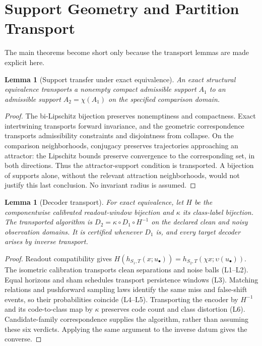 \documentclass[11pt,a4paper]{article}
\newtheorem{lemma}[theorem]{Lemma}
\theoremstyle{definition}
\begin{document}
\section{Support Geometry and Partition Transport}
The main theorems become short only because the transport lemmas are made explicit here.

\begin{lemma}[Support transfer under exact equivalence]\label{lem:support-transfer}
An exact structural equivalence transports a nonempty compact admissible support $A_1$ to an admissible support $A_2=\chi(A_1)$ on the specified comparison domain.
\end{lemma}
\begin{proof}
The bi-Lipschitz bijection preserves nonemptiness and compactness. Exact intertwining transports forward invariance, and the geometric correspondence transports admissibility constraints and disjointness from collapse. On the comparison neighborhoods, conjugacy preserves trajectories approaching an attractor: the Lipschitz bounds preserve convergence to the corresponding set, in both directions. Thus the attractor-support condition is transported. A bijection of supports alone, without the relevant attraction neighborhoods, would not justify this last conclusion. No invariant radius is assumed.
\end{proof}

\begin{lemma}[Decoder transport]\label{lem:decoder-transport}
For exact equivalence, let $H$ be the componentwise calibrated readout-window bijection and $\kappa$ its class-label bijection. The transported algorithm is $D_2=\kappa\circ D_1\circ H^{-1}$ on the declared clean and noisy observation domains. It is certified whenever $D_1$ is, and every target decoder arises by inverse transport.
\end{lemma}
\begin{proof}
Readout compatibility gives $H(h_{S_1,T}(x;u_\bullet))=h_{S_2,T}(\chi x;\upsilon(u_\bullet))$. The isometric calibration transports clean separations and noise balls (L1--L2). Equal horizons and sham schedules transport persistence windows (L3). Matching relations and pushforward sampling laws identify the same miss and false-shift events, so their probabilities coincide (L4--L5). Transporting the encoder by $H^{-1}$ and its code-to-class map by $\kappa$ preserves code count and class distortion (L6). Candidate-family correspondence supplies the algorithm, rather than assuming these six verdicts. Applying the same argument to the inverse datum gives the converse.
\end{proof}
\end{document}
